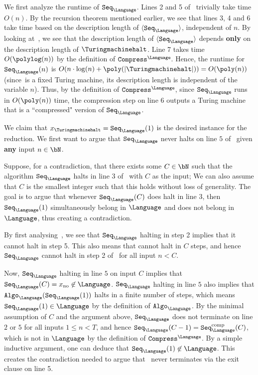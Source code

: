 We first analyze the runtime of $\texttt{Seq}_{\Language}$. Lines 2 and 5 of~ trivially take time $O(n)$. By the recursion theorem mentioned earlier, we see that lines 3, 4 and 6 take time based on the description length of $\langle\texttt{Seq}_{\Language}\rangle$, independent of $n$. By looking at~, we see that the description length of $\langle\texttt{Seq}_{\Language}\rangle$ depends \textbf{only} on the description length of $\text{\Turingmachinehalt}$. Line 7 takes time $O(\polylog(n))$ by the definition of $\texttt{Compress}^{\Language}$. Hence, the runtime for $\texttt{Seq}_{\Language}(n)$ is $O(n \cdot \log(n) + \poly(|\text{\Turingmachinehalt}|)) = O(\poly(n))$ (since~\Turingmachinehalt is a fixed Turing machine, its description length is independent of the variable $n$). Thus, by the definition of $\texttt{Compress}^{\Language}$, since $\texttt{Seq}_{\Language}$ runs in $O(\poly(n))$ time,  the compression step on line 6 outputs a Turing machine that is a ``compressed" version of $\texttt{Seq}_{\Language}$. 

We claim that $x_{\text{\Turingmachinehalt}} = \texttt{Seq}_{\Language}(1)$ is the desired instance for the reduction. We first want to argue that $\texttt{Seq}_{\Language}$ never halts on line $5$ of~ given \textbf{any} input $n \in \bN$. 

Suppose, for a contradiction, that there exists some $C \in \bN$ such that the algorithm $\texttt{Seq}_{\Language}$ halts in line $3$ of~ with $C$ as the input; We can also assume that $C$ is the smallest integer such that this holds without loss of generality. The goal is to argue that whenever $\texttt{Seq}_{\Language}(C)$ does halt in line 3, then $\texttt{Seq}_{\Language}(1)$ simultaneously belong in $\Language$ and does not belong in $\Language$, thus creating a contradiction. 

By first analysing~, we see that $\texttt{Seq}_{\Language}$ halting in step 2 implies that it cannot halt in step 5. This also means that \Turingmachinehalt cannot halt in $C$ steps, and hence $\texttt{Seq}_{\Language}$ cannot halt in step 2 of~ for all input $n < C$. 

Now, $\texttt{Seq}_{\Language}$ halting in line $5$ on input $C$ implies that $\texttt{Seq}_{\Language}(C) = x_{\text{no}} \not\in \Language$.   $\texttt{Seq}_{\Language}$ halting in line $5$ also implies that $\texttt{Algo}_{\Language}(\texttt{Seq}_{\Language}(1))$ halts in a finite number of steps, which means $\texttt{Seq}_{\Language}(1) \in \Language$ by the definition of $\texttt{Algo}_{\Language}$. By the minimal assumption of $C$ and the argument above, $\texttt{Seq}_{\Language}$ does not terminate on line $2$ or $5$ for all inputs $1 \leq n < T$, and hence $\texttt{Seq}_{\Language}(C-1) =  \texttt{Seq}_{\Language}^{\text{comp}}(C)$, which is not in $\Language$ by the definition of $\texttt{Compress}^{\Language}$. By a simple inductive argument, one can deduce that $\texttt{Seq}_{\Language}(1) \not\in \Language$. This creates the contradiction needed to argue that~ never terminates via the exit clause on line 5. 

